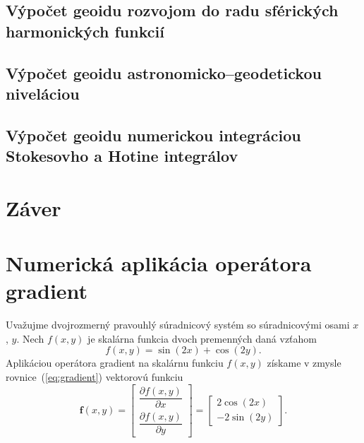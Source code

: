 \documentclass[a4paper, 12pt]{book}
\let\vec\mathbf
\begin{document}

\section{Výpočet geoidu rozvojom do radu sférických harmonických funkcií}







\section{Výpočet geoidu astronomicko--geodetickou niveláciou}







\section{Výpočet geoidu numerickou integráciou Stokesovho a Hotine integrálov}







\chapter*{Záver}







\appendix
\chapter{Numerická aplikácia operátora gradient}
\label{app:numerical_application_of_gradient}

Uvažujme dvojrozmerný pravouhlý súradnicový systém so súradnicovými osami $x$, 
$y$.  Nech $f(x, y)$ je skalárna funkcia dvoch premenných daná vzťahom
%
\begin{equation}
\label{eq:f}
f(x, y) = \sin(2x) + \cos(2y){.}
\end{equation}
%
Aplikáciou operátora gradient na skalárnu funkciu $f(x, y)$ získame v zmysle 
rovnice~(\ref{eq:gradient}) vektorovú funkciu
%
\begin{equation}
\label{eq:gradf}
\vec f(x, y) =
\begin{bmatrix}
\dfrac{\partial f(x, y)}{\partial x} \\[2ex]
\dfrac{\partial f(x, y)}{\partial y}
\end{bmatrix}
=
\begin{bmatrix}
2 \cos(2x) \\[2ex]
-2 \sin(2y)
\end{bmatrix}
{.}
\end{equation}
\end{document}
